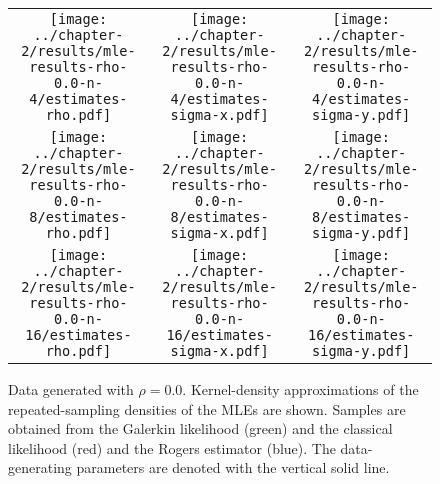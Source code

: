 \begin{figure}
  \centering
  \begin{tabular}{ccc}
    \begin{minipage}{0.3\textwidth}
      \centering
      \texttt{[image: ../chapter-2/results/mle-results-rho-0.0-n-4/estimates-rho.pdf]}
    \end{minipage}
    & \begin{minipage}{0.3\textwidth}
      \centering
      \texttt{[image: ../chapter-2/results/mle-results-rho-0.0-n-4/estimates-sigma-x.pdf]}
    \end{minipage}
    & \begin{minipage}{0.3\textwidth}
      \centering
      \texttt{[image: ../chapter-2/results/mle-results-rho-0.0-n-4/estimates-sigma-y.pdf]}
    \end{minipage} \\
    \begin{minipage}{0.3\textwidth}
      \centering
      \texttt{[image: ../chapter-2/results/mle-results-rho-0.0-n-8/estimates-rho.pdf]}
    \end{minipage}
    & \begin{minipage}{0.3\textwidth}
      \centering
      \texttt{[image: ../chapter-2/results/mle-results-rho-0.0-n-8/estimates-sigma-x.pdf]}
    \end{minipage}
    & \begin{minipage}{0.3\textwidth}
      \centering
      \texttt{[image: ../chapter-2/results/mle-results-rho-0.0-n-8/estimates-sigma-y.pdf]}
    \end{minipage} \\
    \begin{minipage}{0.3\textwidth}
      \centering
      \texttt{[image: ../chapter-2/results/mle-results-rho-0.0-n-16/estimates-rho.pdf]}
    \end{minipage}
    & \begin{minipage}{0.3\textwidth}
      \centering
      \texttt{[image: ../chapter-2/results/mle-results-rho-0.0-n-16/estimates-sigma-x.pdf]}
    \end{minipage}
    & \begin{minipage}{0.3\textwidth}
      \centering
      \texttt{[image: ../chapter-2/results/mle-results-rho-0.0-n-16/estimates-sigma-y.pdf]}
    \end{minipage}
  \end{tabular}
  \caption{Data generated with $\rho=0.0$. Kernel-density
    approximations of the repeated-sampling densities of the MLEs are
    shown.  Samples are obtained from the Galerkin likelihood (green)
    and the classical likelihood (red) and the Rogers estimator
    (blue). The data-generating parameters are denoted with the
    vertical solid line.}
  \label{fig:mle-comparison-rho-0.0}
\end{figure}
